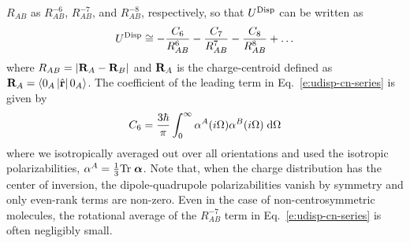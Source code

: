 \documentclass[a4paper,titlepage,twoside,fleqn,12pt]{book}
\newcommand{\BM}[1]{\ensuremath{\mbox{\boldmath${#1}$}}}
\begin{document}
\begin{refsection}
$R_{AB}$ as $R^{-6}_{AB}$, $R^{-7}_{AB}$, and $R^{-8}_{AB}$, 
respectively, so that $U^{\rm Disp}$ can be written as
%
\begin{equation} \label{e:udisp-cn-series}
 U^{\rm Disp} \cong -\frac{C_6}{R^{6}_{AB}} -\frac{C_7}{R^{7}_{AB}} -\frac{C_8}{R^{8}_{AB}} + \ldots
\end{equation}
%
where $R_{AB}=\left|{\bf R}_A-{\bf R}_B\right|$ 
and ${\bf R}_A$ is the charge\hyp{}centroid 
defined as ${\bf R}_A=\langle 0_A\left|\hat{\bf r}\right|0_A\rangle$. 
The coefficient of the leading term in Eq.~\eqref{e:udisp-cn-series} is given by
%
\begin{equation} \label{e:c6}
 C_6 = \frac{3\hbar}{\pi} \int_0^\infty \alpha^A(i\Omega) \alpha^B(i\Omega) \;{\rm d}\Omega
\end{equation}
%
where we isotropically averaged out over all orientations and used the 
isotropic polarizabilities, $\alpha^A=\frac{1}{3}{\rm Tr}\;{\BM \alpha}$.
Note that, when the charge distribution has the center of inversion, 
the dipole\hyp{}quadrupole polarizabilities vanish by symmetry 
and only even\hyp{}rank terms are non\hyp{}zero. Even in the case 
of non-centrosymmetric molecules, the rotational average 
of the $R^{-7}_{AB}$ term in Eq.~\eqref{e:udisp-cn-series} 
is often negligibly small.\citep{Stone.TheTheoryOfIntermolecularForces.1996}


\end{refsection}
\end{document}
